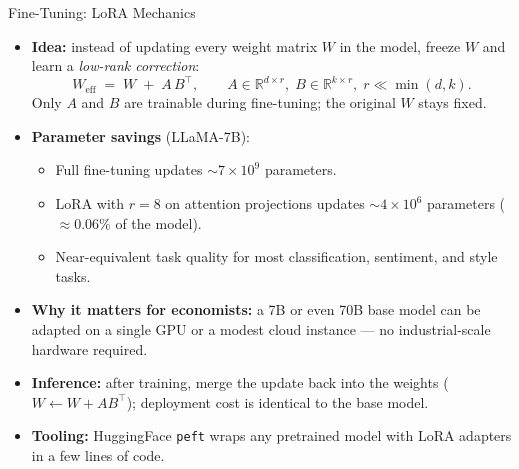 \begin{frame}{Fine-Tuning: LoRA Mechanics}
\begin{itemize}
\item \textbf{Idea:} instead of updating every weight matrix $W$ in the model, freeze $W$ and learn a \emph{low-rank correction}:
\[
   W_{\text{eff}} \;=\; W \;+\; A\,B^{\top}, \qquad A \in \mathbb{R}^{d \times r},\; B \in \mathbb{R}^{k \times r},\; r \ll \min(d, k).
\]
Only $A$ and $B$ are trainable during fine-tuning; the original $W$ stays fixed.

\medskip
\item \textbf{Parameter savings} (LLaMA-7B):
\begin{itemize}
    \item Full fine-tuning updates $\sim\!7 \times 10^{9}$ parameters.
    \item LoRA with $r = 8$ on attention projections updates $\sim\!4 \times 10^{6}$ parameters ($\approx 0.06\%$ of the model).
    \item Near-equivalent task quality for most classification, sentiment, and style tasks.
\end{itemize}

\medskip
\item \textbf{Why it matters for economists:} a 7B or even 70B base model can be adapted on a single GPU or a modest cloud instance --- no industrial-scale hardware required.

\medskip
\item \textbf{Inference:} after training, merge the update back into the weights ($W \leftarrow W + A B^{\top}$); deployment cost is identical to the base model.

\medskip
\item \textbf{Tooling:} HuggingFace \texttt{peft} wraps any pretrained model with LoRA adapters in a few lines of code.
\end{itemize}
\end{frame}

